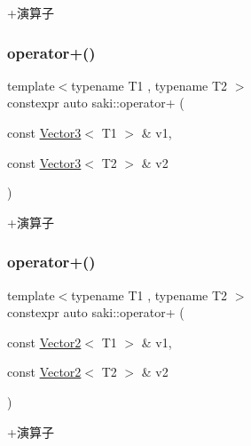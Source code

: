 +演算子 

\mbox{\label{namespacesaki_a482be906f8ccfd7fa303391e28e44f05}} 
\subsubsection{\texorpdfstring{operator+()}{operator+()}\hspace{0.1cm}{\footnotesize\ttfamily [3/5]}}
{\footnotesize\ttfamily template$<$typename T1 , typename T2 $>$ \\
constexpr auto saki\+::operator+ (\begin{DoxyParamCaption}\item[{const \mbox{\hyperlink{classsaki_1_1_vector3}{Vector3}}$<$ T1 $>$ \&}]{v1,  }\item[{const \mbox{\hyperlink{classsaki_1_1_vector3}{Vector3}}$<$ T2 $>$ \&}]{v2 }\end{DoxyParamCaption})}



+演算子 

\mbox{\label{namespacesaki_afa72a33da6ac050bfd8e91b9eae1422a}} 
\subsubsection{\texorpdfstring{operator+()}{operator+()}\hspace{0.1cm}{\footnotesize\ttfamily [4/5]}}
{\footnotesize\ttfamily template$<$typename T1 , typename T2 $>$ \\
constexpr auto saki\+::operator+ (\begin{DoxyParamCaption}\item[{const \mbox{\hyperlink{classsaki_1_1_vector2}{Vector2}}$<$ T1 $>$ \&}]{v1,  }\item[{const \mbox{\hyperlink{classsaki_1_1_vector2}{Vector2}}$<$ T2 $>$ \&}]{v2 }\end{DoxyParamCaption})}



+演算子 

\mbox{\label{namespacesaki_a2ce80b823ffc05593663b5ebaeac9ff2}} 
